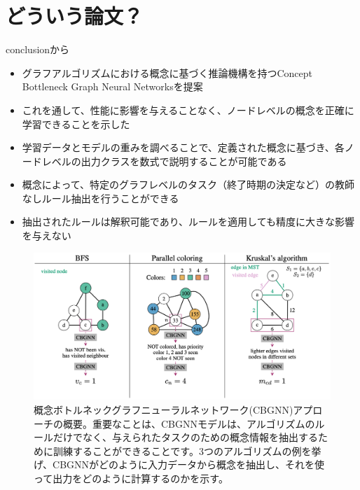 \documentclass[a4paper,10pt]{ltjsarticle}
\newcommand{\1}{\mbox{1}\hspace{-0.25em}\mbox{l}}
\theoremstyle{definition}
\begin{document}
    \section{どういう論文？}
    conclusionから
    \begin{itemize}
        \item グラフアルゴリズムにおける概念に基づく推論機構を持つConcept Bottleneck Graph Neural Networksを提案
        \item これを通して、性能に影響を与えることなく、ノードレベルの概念を正確に学習できることを示した
        \item 学習データとモデルの重みを調べることで、定義された概念に基づき、各ノードレベルの出力クラスを数式で説明することが可能である
        \item 概念によって、特定のグラフレベルのタスク（終了時期の決定など）の教師なしルール抽出を行うことができる
        \item 抽出されたルールは解釈可能であり、ルールを適用しても精度に大きな影響を与えない
    \end{itemize}
    \begin{figure}[H]
        \centering
        \includegraphics[width=120mm]{fig/cbgnn_1}
        \caption{概念ボトルネックグラフニューラルネットワーク(CBGNN)アプローチの概要。重要なことは、CBGNNモデルは、アルゴリズムのルールだけでなく、与えられたタスクのための概念情報を抽出するために訓練することができることです。3つのアルゴリズムの例を挙げ、CBGNNがどのように入力データから概念を抽出し、それを使って出力をどのように計算するのかを示す。}
    \end{figure}
\end{document}
